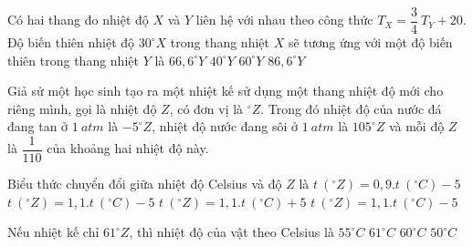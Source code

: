 \begin{vidu} 
	Có hai thang đo nhiệt độ $X$ và $Y$ liên hệ với nhau theo công thức $T_{X}=\dfrac{3}{4} \ T_{Y}+20$. Độ biến thiên nhiệt độ $30^\circ X$ trong thang nhiệt $X$ sẽ tương ứng với một độ biến thiên trong thang nhiệt $Y$ là
	\choice
	{$66,6^\circ Y$}
	{\True $40^\circ Y$}
	{$60^\circ Y$}
	{$86,6^\circ Y$}
\end{vidu}
 \begin{vidu} 
 	Giả sử một học sinh tạo ra một nhiệt kế sử dụng một thang nhiệt độ mới cho riêng mình, gọi là nhiệt độ $Z$, có đơn vị là ${}^\circ Z$. Trong đó nhiệt độ của nước đá đang tan ở $1\ atm$ là $-5^\circ Z$, nhiệt độ nước đang sôi ở $1\ atm$ là $105^\circ Z$ và mỗi độ $Z$ là $\dfrac{1}{110}$ của khoảng hai nhiệt độ này.
 	\begin{vdc}
 		Biểu thức chuyển đổi giữa nhiệt độ Celsius và độ $Z$ là
 		\choice
 		{$t\ (^\circ Z) = 0,9.t\ (^\circ C) - 5$}
 		{\True $t\ (^\circ Z) = 1,1.t\ (^\circ C) - 5$}
 		{$t\ (^\circ Z) = 1,1.t\ (^\circ C) + 5$}
 		{$t\ (^\circ Z) = 1,1. t\ (^\circ C) - 5$}

 	\end{vdc}
 	\dotlineEX{4}
 	\begin{vdc}
 		Nếu nhiệt kế chỉ $61^\circ Z$, thì nhiệt độ của vật theo Celsius là
 		\choice
 		{$55^\circ C$}
 		{$61^\circ C$}
 		{\True $60^\circ C$}
 		{$50^\circ C$}


\end{vdc}
\end{vidu}
